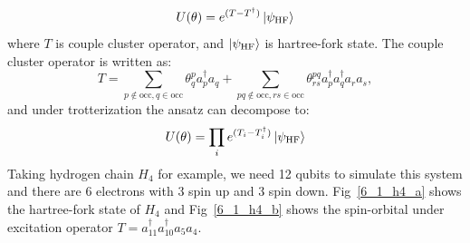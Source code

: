 \begin{equation}
    U(\theta) = e^{(T-T^\dagger)}\ket{\psi_\text{HF}}
\end{equation}
where $T$ is couple cluster operator, and $\ket{\psi_\text{HF}}$ is hartree-fork state. The couple cluster operator is written as:
\begin{equation}
    T=\sum_{p\notin\text{occ},q\in\text{occ}}\theta_q^p a_p^\dagger a_q + \sum_{pq\notin\text{occ},rs\in\text{occ}}\theta_{rs}^{pq}a_p^\dagger a_q^\dagger a_r a_s,
\end{equation}
and under trotterization the ansatz can decompose to:
\begin{equation}
    U(\theta)=\prod_ie^{(T_i-T_i^\dagger)}\ket{\psi_\text{HF}}
\end{equation}
Taking hydrogen chain $H_4$ for example, we need 12 qubits to simulate this system and there are 6 electrons with 3 spin up and 3 spin down. Fig~\ref{6_1_h4_a} shows the hartree-fork state of $H_4$ and Fig~\ref{6_1_h4_b} shows the spin-orbital under excitation operator $T=a_{11}^\dagger a_{10}^\dagger a_5 a_4$.
